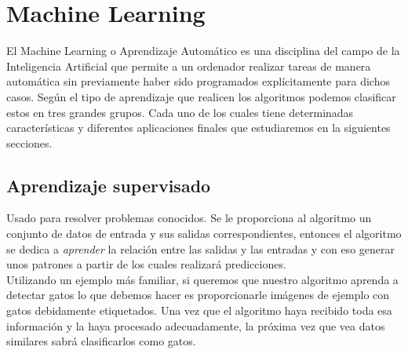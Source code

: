 \section{Machine Learning}
\label{sec:machine_learning}

El Machine Learning o Aprendizaje Automático es una disciplina del campo de la Inteligencia Artificial que permite a un ordenador realizar tareas de manera automática sin previamente haber sido programados explícitamente para dichos casos. Según el tipo de aprendizaje que realicen los algoritmos podemos clasificar estos en tres grandes grupos. Cada uno de los cuales tiene determinadas características y diferentes aplicaciones finales que estudiaremos en la siguientes secciones.

\subsection{Aprendizaje supervisado}

Usado para resolver problemas conocidos. Se le proporciona al algoritmo un conjunto de datos de entrada y sus salidas correspondientes, entonces el algoritmo se dedica a \textit{aprender} la relación entre las salidas y las entradas y con eso generar unos patrones a partir de los cuales realizará predicciones.\\

Utilizando un ejemplo más familiar, si queremos que nuestro algoritmo aprenda a detectar gatos lo que debemos hacer es proporcionarle imágenes de ejemplo con gatos debidamente etiquetados. Una vez que el algoritmo haya recibido toda esa información y la haya procesado adecuadamente, la próxima vez que vea datos similares sabrá clasificarlos como gatos.\\


